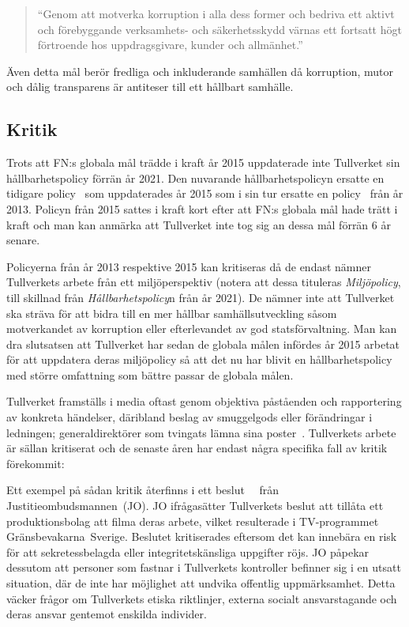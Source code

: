 \begin{quotation}
    ``Genom att motverka korruption i alla dess former och bedriva ett aktivt
    och förebyggande verksamhets- och säkerhetsskydd värnas ett fortsatt högt
    förtroende hos uppdragsgivare, kunder och allmänhet.''
\end{quotation}

Även detta mål berör fredliga och inkluderande samhällen då korruption, mutor
och dålig transparens är antiteser till ett hållbart samhälle.

\subsection{Kritik}

Trots att FN:s globala mål trädde i kraft år 2015 uppdaterade inte Tullverket
sin hållbarhetspolicy förrän år 2021. Den nuvarande hållbarhetspolicyn ersatte
en tidigare policy~\cite{policy2015} som uppdaterades år 2015 som i sin tur
ersatte en policy~\cite{policy2013} från år 2013. Policyn från 2015 sattes i
kraft kort efter att FN:s globala mål hade trätt i kraft och man kan anmärka
att Tullverket inte tog sig an dessa mål förrän 6 år senare. 

Policyerna från år 2013 respektive 2015 kan kritiseras då de endast nämner
Tullverkets arbete från ett miljöperspektiv (notera att dessa tituleras
\emph{Miljöpolicy}, till skillnad från \emph{Hållbarhetspolicy}n från år 2021).
De nämner inte att Tullverket ska sträva för att bidra till en mer hållbar
samhällsutveckling såsom motverkandet av korruption eller efterlevandet av god
statsförvaltning.
%
Man kan dra slutsatsen att Tullverket har sedan de globala målen infördes år
2015 arbetat för att uppdatera deras miljöpolicy så att det nu har blivit en
hållbarhetspolicy med större omfattning som bättre passar de globala målen.

Tullverket framställs i media oftast genom objektiva påståenden och
rapportering av konkreta händelser, däribland beslag av smuggelgods eller
förändringar i ledningen; generaldirektörer som tvingats lämna sina
poster~\cite{dn-gd}. Tullverkets arbete är sällan kritiserat och de senaste
åren har endast några specifika fall av kritik förekommit:

Ett exempel på sådan kritik återfinns i ett
beslut~\cite{dj-jo}~\cite{jo-uttalande} från Justitieombudsmannen~(JO). JO
ifrågasätter Tullverkets beslut att tillåta ett produktionsbolag att filma
deras arbete, vilket resulterade i TV-programmet Gränsbevakarna~Sverige.
Beslutet kritiserades eftersom det kan innebära en risk för att
sekretessbelagda eller integritetskänsliga uppgifter röjs. JO påpekar dessutom
att personer som fastnar i Tullverkets kontroller befinner sig i en utsatt
situation, där de inte har möjlighet att undvika offentlig uppmärksamhet. Detta
väcker frågor om Tullverkets etiska riktlinjer, externa socialt ansvarstagande
och deras ansvar gentemot enskilda individer. 

